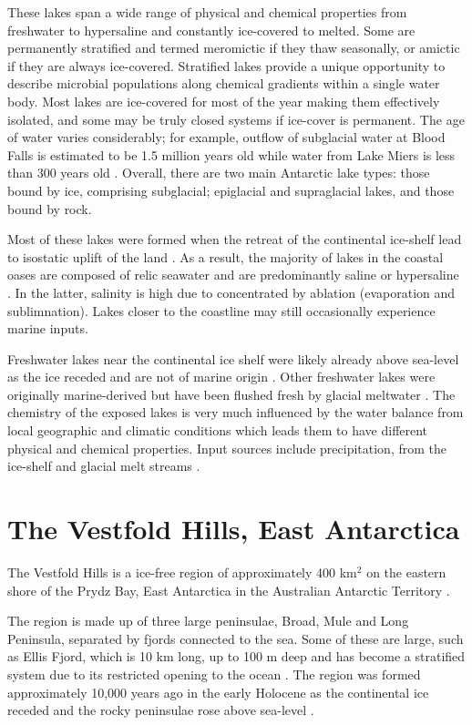 These lakes span a wide range of physical and chemical properties from freshwater to hypersaline and constantly ice-covered to melted.
Some are permanently stratified and termed meromictic if they thaw seasonally, or amictic if they are always ice-covered.
Stratified lakes provide a unique opportunity to describe microbial populations along chemical gradients within a single water body. 
Most lakes are ice-covered for most of the year making them effectively isolated, and some may be truly closed systems if ice-cover is permanent.
The age of water varies considerably; for example, outflow of subglacial water at Blood Falls is estimated to be 1.5 million years old \cite{Mikucki2009} while water from Lake Miers is less than 300 years old \cite{Green1988}. 
Overall, there are two main Antarctic lake types: those bound by ice, comprising subglacial; epiglacial and supraglacial lakes, and those bound by rock.


Most of these lakes were formed when the retreat of the continental ice-shelf lead to isostatic uplift of the land \cite{Burton1981}. %
As a result, the majority of lakes in the coastal oases are composed of relic seawater and are predominantly saline or hypersaline \cite{Burke1988}.
In the latter, salinity is high due to concentrated by ablation (evaporation and sublimnation). %
Lakes closer to the coastline may still occasionally experience marine inputs. %


Freshwater lakes near the continental ice shelf were likely already above sea-level as the ice receded and are not of marine origin \cite{Bronge1996}. %
Other freshwater lakes were originally marine-derived but have been flushed fresh by glacial meltwater \cite{Pickard1986}.
The chemistry of the exposed lakes is very much influenced by the water balance from local geographic and climatic conditions which leads them to have different physical and chemical properties.
Input sources include precipitation, from the ice-shelf and glacial melt streams \cite{Burton1981}. 



\section{The Vestfold Hills, East Antarctica}
The Vestfold Hills  is a ice-free region of approximately 400 km$^2$ on the eastern shore of the Prydz Bay, East Antarctica in the Australian Antarctic Territory \cite{Gibson1999}.

The region is made up of three large peninsulae, Broad, Mule and Long Peninsula, separated by fjords connected to the sea.
Some of these are large, such as Ellis Fjord, which is 10 km long, up to 100 m deep and has become a stratified system due to its restricted opening to the ocean \cite{Burke1988}.
The region was formed approximately 10,000 years ago in the early Holocene as the continental ice receded and the rocky peninsulae rose above sea-level \cite{Zwartz1998}. 

